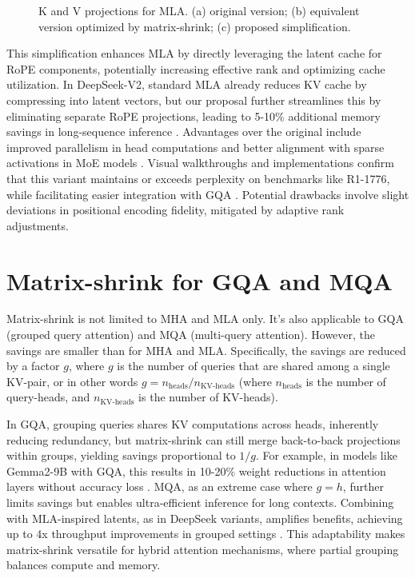 \documentclass{article}
\begin{document}
\begin{figure}[h]
\centering
\caption{K and V projections for MLA. (a) original version; (b) equivalent version optimized by matrix-shrink; (c) proposed simplification.}
\label{fig:fig3}
\end{figure}

This simplification enhances MLA by directly leveraging the latent cache for RoPE components, potentially increasing effective rank and optimizing cache utilization. In DeepSeek-V2, standard MLA already reduces KV cache by compressing into latent vectors, but our proposal further streamlines this by eliminating separate RoPE projections, leading to 5-10\% additional memory savings in long-sequence inference \cite{deepseek2024}. Advantages over the original include improved parallelism in head computations and better alignment with sparse activations in MoE models \cite{acl2023lowrank}. Visual walkthroughs and implementations confirm that this variant maintains or exceeds perplexity on benchmarks like R1-1776, while facilitating easier integration with GQA \cite{towardsai2024mla}. Potential drawbacks involve slight deviations in positional encoding fidelity, mitigated by adaptive rank adjustments.

\section{Matrix-shrink for GQA and MQA}
Matrix-shrink is not limited to MHA and MLA only. It’s also applicable to GQA (grouped query attention) and MQA (multi-query attention). However, the savings are smaller than for MHA and MLA. Specifically, the savings are reduced by a factor $g$, where $g$ is the number of queries that are shared among a single KV-pair, or in other words $g = n_{\text{heads}}/n_{\text{KV-heads}}$ (where $n_{\text{heads}}$ is the number of query-heads, and $n_{\text{KV-heads}}$ is the number of KV-heads).

In GQA, grouping queries shares KV computations across heads, inherently reducing redundancy, but matrix-shrink can still merge back-to-back projections within groups, yielding savings proportional to $1/g$. For example, in models like Gemma2-9B with GQA, this results in 10-20\% weight reductions in attention layers without accuracy loss \cite{towardsai2024mla}. MQA, as an extreme case where $g = h$, further limits savings but enables ultra-efficient inference for long contexts. Combining with MLA-inspired latents, as in DeepSeek variants, amplifies benefits, achieving up to 4x throughput improvements in grouped settings \cite{deepseek2024}. This adaptability makes matrix-shrink versatile for hybrid attention mechanisms, where partial grouping balances compute and memory.
\end{document}
